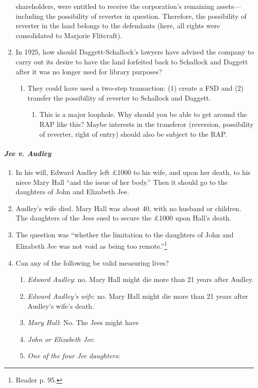 \begin{enumerate}
    shareholders, were entitled to receive the corporation's remaining 
    assets---including the possibility of reverter in question. Therefore, the 
    possibility of reverter in the land belongs to the defendants (here, all 
    rights were consolidated to Marjorie Flitcraft).
    \item In 1925, how should Daggett-Schallock's lawyers have advised the 
    company to carry out its desire to have the land forfeited back to 
    Schallock and Daggett after it was no longer used for library purposes?
    \begin{enumerate}
        \item They could have used a two-step transaction: (1) create a FSD 
        and (2) transfer the possibility of reverter to Schallock and Daggett.
        \begin{enumerate}
            \item This is a major loophole. Why should you be able to get 
            around the RAP like this? Maybe interests in the transferor 
            (reversion, possibility of reverter, right of entry) should also 
            be subject to the RAP.
        \end{enumerate}
    \end{enumerate}
\end{enumerate}

\paragraph{\emph{Jee v. Audley}}


\begin{enumerate}
    \item In his will, Edward Audley left \pounds 1000 to his wife, and upon 
    her death, to his niece Mary Hall ``and the issue of her body.'' Then it 
    should go to the daughters of John and Elizabeth Jee.
    \item Audley's wife died. Mary Hall was about 40, with no husband or 
    children. The daughters of the Jees sued to secure the \pounds 1000 upon 
    Hall's death.
    \item The question was ``whether the limitation to the daughters of John 
    and Elizabeth Jee was not void as being too remote.''\footnote{Reader p. 
    95.}
    \item Can any of the following be valid measuring lives?
    \begin{enumerate}
        \item \emph{Edward Audley}: no. Mary Hall might die more than 21 years 
        after Audley.
        \item \emph{Edward Audley's wife}: no. Mary Hall might die more than 
        21 years after Audley's wife's death.
        \item \emph{Mary Hall}: No. The Jees might have 
        \item \emph{John or Elizabeth Jee}:
        \item \emph{One of the four Jee daughters}:
    \end{enumerate}
\end{enumerate}

